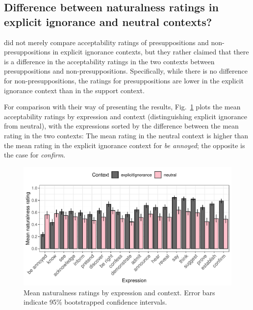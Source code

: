 \documentclass[11pt,fleqn]{article}
\newcommand{\6}{\mbox{$[\hspace*{-.6mm}[$}}
\newcommand{\9}{\mbox{$]\hspace*{-.6mm}]$}}
\begin{document}
\subsection{Difference between naturalness ratings in explicit ignorance and neutral contexts?}

\citealt{mandelkern-etal2020} did not merely compare acceptability ratings of presuppositions and non-presuppositions in explicit ignorance contexts, but they rather claimed that there is a difference in the acceptability ratings in the two contexts between presuppositions and non-presuppositions. Specifically, while there is no difference for non-presuppositions, the ratings for presuppositions are lower in the explicit ignorance context than in the support context.

For comparison with their way of presenting the results, Fig.~\ref{fig:acc-by-context2} plots the mean acceptability ratings by expression and context (distinguishing explicit ignorance from neutral), with the expressions sorted by the difference between the mean rating in the two contexts: The mean rating in the neutral context is higher than the mean rating in the explicit ignorance context for {\em be annoyed}; the opposite is the case for {\em confirm}.

\begin{figure}[h!]
\centering
\includegraphics[width=\textwidth]{../../results/main/13explicitIgnorance/graphs/naturalness-by-context2-and-predicate}
\caption{Mean naturalness ratings by expression and context. Error bars indicate 95\% bootstrapped confidence intervals.}\label{fig:acc-by-context2}
\end{figure}
\end{document}
